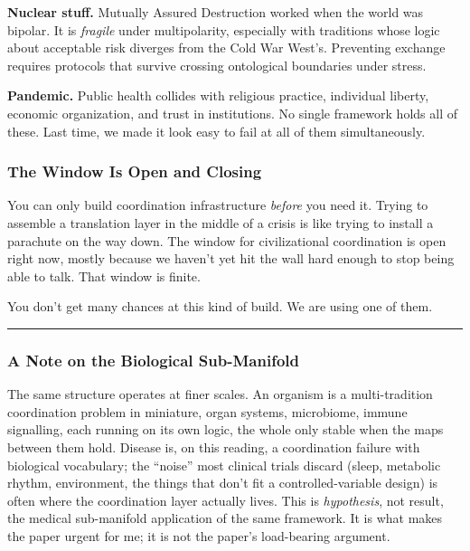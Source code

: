 \documentclass[
]{article}
\begin{document}
\textbf{Nuclear stuff.} Mutually Assured Destruction worked when the
world was bipolar. It is \emph{fragile} under multipolarity, especially
with traditions whose logic about acceptable risk diverges from the Cold
War West's. Preventing exchange requires protocols that survive crossing
ontological boundaries under stress.

\textbf{Pandemic.} Public health collides with religious practice,
individual liberty, economic organization, and trust in institutions. No
single framework holds all of these. Last time, we made it look easy to
fail at all of them simultaneously.

\subsubsection{The Window Is Open and
Closing}\label{the-window-is-open-and-closing}

You can only build coordination infrastructure \emph{before} you need
it. Trying to assemble a translation layer in the middle of a crisis is
like trying to install a parachute on the way down. The window for
civilizational coordination is open right now, mostly because we haven't
yet hit the wall hard enough to stop being able to talk. That window is
finite.

You don't get many chances at this kind of build. We are using one of
them.

\begin{center}\rule{0.5\linewidth}{0.5pt}\end{center}

\subsubsection{A Note on the Biological
Sub-Manifold}\label{a-note-on-the-biological-sub-manifold}

The same structure operates at finer scales. An organism is a
multi-tradition coordination problem in miniature, organ systems,
microbiome, immune signalling, each running on its own logic, the whole
only stable when the maps between them hold. Disease is, on this
reading, a coordination failure with biological vocabulary; the
``noise'' most clinical trials discard (sleep, metabolic rhythm,
environment, the things that don't fit a controlled-variable design) is
often where the coordination layer actually lives. This is
\emph{hypothesis}, not result, the medical sub-manifold application of
the same framework. It is what makes the paper urgent for me; it is not
the paper's load-bearing argument.
\end{document}
